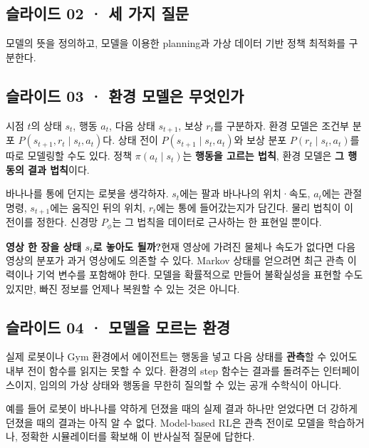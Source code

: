 \documentclass[11pt,a4paper]{article}
\begin{document}
\subsection{슬라이드 02 · 세 가지 질문}

모델의 뜻을 정의하고, 모델을 이용한 planning과 가상 데이터 기반 정책 최적화를 구분한다.\par

\subsection{슬라이드 03 · 환경 모델은 무엇인가}

시점 $t$의 상태 $s_t$, 행동 $a_t$, 다음 상태 $s_{t+1}$, 보상 $r_t$를 구분하자. 환경 모델은 조건부 분포 $P(s_{t+1},r_t\mid s_t,a_t)$다. 상태 전이 $P(s_{t+1}\mid s_t,a_t)$와 보상 분포 $P(r_t\mid s_t,a_t)$를 따로 모델링할 수도 있다. 정책 $\pi(a_t\mid s_t)$는 \textbf{행동을 고르는 법칙}, 환경 모델은 \textbf{그 행동의 결과 법칙}이다.\par

바나나를 통에 던지는 로봇을 생각하자. $s_t$에는 팔과 바나나의 위치·속도, $a_t$에는 관절 명령, $s_{t+1}$에는 움직인 뒤의 위치, $r_t$에는 통에 들어갔는지가 담긴다. 물리 법칙이 이 전이를 정한다. 신경망 $P_\phi$는 그 법칙을 데이터로 근사하는 한 표현일 뿐이다.\par

\par\medskip\noindent\textbf{영상 한 장을 상태 $s_t$로 놓아도 될까?}\quad 현재 영상에 가려진 물체나 속도가 없다면 다음 영상의 분포가 과거 영상에도 의존할 수 있다. Markov 상태를 얻으려면 최근 관측 이력이나 기억 변수를 포함해야 한다. 모델을 확률적으로 만들어 불확실성을 표현할 수도 있지만, 빠진 정보를 언제나 복원할 수 있는 것은 아니다.\par

\subsection{슬라이드 04 · 모델을 모르는 환경}

실제 로봇이나 Gym 환경에서 에이전트는 행동을 넣고 다음 상태를 \textbf{관측}할 수 있어도 내부 전이 함수를 읽지는 못할 수 있다. 환경의 step 함수는 결과를 돌려주는 인터페이스이지, 임의의 가상 상태와 행동을 무한히 질의할 수 있는 공개 수학식이 아니다.\par

예를 들어 로봇이 바나나를 약하게 던졌을 때의 실제 결과 하나만 얻었다면 더 강하게 던졌을 때의 결과는 아직 알 수 없다. Model-based RL은 관측 전이로 모델을 학습하거나, 정확한 시뮬레이터를 확보해 이 반사실적 질문에 답한다.\par
\end{document}
